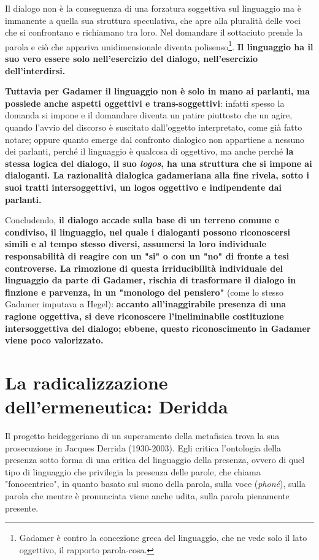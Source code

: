 Il dialogo non è la conseguenza di una forzatura soggettiva sul linguaggio ma è immanente a quella sua struttura speculativa, che apre alla pluralità delle voci che si confrontano e richiamano tra loro. Nel domandare il sottaciuto prende la parola e ciò che appariva unidimensionale diventa polisenso\footnote{Gadamer è contro la concezione greca del linguaggio, che ne vede solo il lato oggettivo, il rapporto parola-cosa.}. \textbf{Il linguaggio ha il suo vero essere solo nell'esercizio del dialogo, nell'esercizio dell'interdirsi.}

\textbf{Tuttavia per Gadamer il linguaggio non è solo in mano ai parlanti, ma possiede anche aspetti oggettivi e trans-soggettivi}: infatti spesso la domanda si impone e il domandare diventa un patire piuttosto che un agire, quando l'avvio del discorso è suscitato dall'oggetto interpretato, come già fatto notare; oppure quanto emerge dal confronto dialogico non appartiene a nessuno dei parlanti, perché il linguaggio è qualcosa di oggettivo, ma anche perché \textbf{la stessa logica del dialogo, il suo \textit{logos}, ha una struttura che si impone ai dialoganti. La razionalità dialogica gadameriana alla fine rivela, sotto i suoi tratti intersoggettivi, un logos oggettivo e indipendente dai parlanti.}

Concludendo,\textbf{ il dialogo accade sulla base di un terreno comune e condiviso, il linguaggio, nel quale i dialoganti possono riconoscersi simili e al tempo stesso diversi, assumersi la loro individuale responsabilità di reagire con un "si" o con un "no" di fronte a tesi controverse. La rimozione di questa irriducibilità individuale del linguaggio da parte di Gadamer, rischia di trasformare il dialogo in finzione e parvenza, in un "monologo del pensiero"} (come lo stesso Gadamer imputava a Hegel): \textbf{accanto all'inaggirabile presenza di una ragione oggettiva, si deve riconoscere l'ineliminabile costituzione intersoggettiva del dialogo; ebbene, questo riconoscimento in Gadamer viene poco valorizzato.}

\section{La radicalizzazione dell'ermeneutica: Deridda}

Il progetto heideggeriano di un superamento della
metafisica trova la sua prosecuzione in Jacques Derrida
(1930-2003). Egli critica l'ontologia della presenza
sotto forma di una critica del linguaggio della
presenza, ovvero di quel tipo di linguaggio che privilegia
la presenza delle parole, che chiama "fonocentrico",
in quanto basato sul suono della parola, sulla voce
(\textit{phoné}), sulla parola che mentre è pronunciata viene
anche udita, sulla parola pienamente presente.

